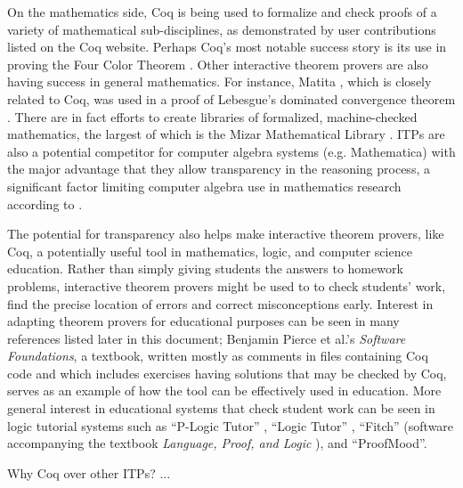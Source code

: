\documentclass[11pt]{amsart}
\begin{document}
On the mathematics side, Coq is being used to formalize and check proofs of a variety of mathematical sub-disciplines, as demonstrated by user contributions listed on the Coq website.  Perhaps Coq's most notable success story is its use in proving the Four Color Theorem \cite{gonthier2005computer}.  Other interactive theorem provers are also having success in general mathematics.  For instance, Matita \cite{Matita}, which is closely related to Coq, was used in a proof of Lebesgue's dominated convergence theorem \cite{coen2008constructive}.  There are in fact efforts to create libraries of formalized, machine-checked mathematics, the largest of which is the Mizar Mathematical Library \cite{geuvers2009proof}.  ITPs are also a potential competitor for computer algebra systems (e.g. Mathematica) with the major advantage that they allow transparency in the reasoning process, a significant factor limiting computer algebra use in mathematics research according to \cite{bunt2009friend}.

The potential for transparency also helps make interactive theorem provers, like Coq, a potentially useful tool in mathematics, logic, and computer science education.  Rather than simply giving students the answers to homework problems, interactive theorem provers might be used to to check students' work, find the precise location of errors and correct misconceptions early.  Interest in adapting theorem provers for educational purposes can be seen in many references listed later in this document; Benjamin Pierce et al.'s \textit{Software Foundations}\cite{pierce2010software}, a textbook, written mostly as comments in files containing Coq code and which includes exercises having solutions that may be checked by Coq, serves as an example of how the tool can be effectively used in education.  More general interest in educational systems that check student work can be seen in logic tutorial systems such as ``P-Logic Tutor'' \cite{lukins2002tutorial}, ``Logic Tutor'' \cite{lesta2002intelligent}, ``Fitch'' (software accompanying the textbook \textit{Language, Proof, and Logic} \cite{barwise2000language}), and ``ProofMood''\cite{ProofMood}.

Why Coq over other ITPs? ...
\end{document}
